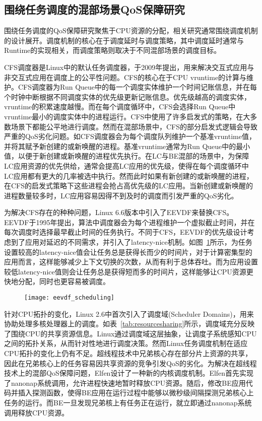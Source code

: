 \subsection{围绕任务调度的混部场景QoS保障研究}


围绕任务调度的QoS保障研究聚焦于CPU资源的分配，相关研究通常围绕调度机制的设计展开。调度机制的核心在于调度延时与调度策略，其中调度延时通常与Runtime的实现相关，而调度策略则取决于不同混部场景的调度目标。

CFS调度器\citep{pabla2009completely}是Linux中的默认任务调度器，于2009年提出，用来解决交互式应用与非交互式应用在调度上的公平性问题。CFS的核心在于CPU vruntime的计算与维护。CFS调度器为Run Queue中的每一个调度实体维护一个时间记账信息，并在每个时钟中断根据不同调度实体的优先级更新记账信息。优先级越高的调度实体，vruntime的积累速度越慢。而在每个调度循环中，CFS会选择Run Queue中vruntime最小的调度实体中的进程运行。CFS中使用了许多启发式的策略，在大多数场景下都能公平地进行调度。然而在混部场景中，CFS的部分启发式逻辑会导致严重的QoS劣化问题。如CFS调度器会为每个调度队列维护一个基准vruntime值，并将其赋予新创建的或新唤醒的进程。基准vruntime通常为Run Queue中的最小值，以便于新创建或新唤醒的进程优先执行。在LC与BE混部的场景中，为保障LC应用资源的优先供给，通常会提高LC应用的优先级，使得在每个调度循环中LC应用都有更大的几率被选中执行。然而此时如果有新创建的或新唤醒的进程，在CFS的启发式策略下这些进程会抢占高优先级的LC应用。当新创建或新唤醒的进程数量较多时，LC应用容易因得不到及时的调度而引发严重的QoS劣化。

为解决CFS存在的种种问题，Linux 6.6版本中引入了EEVDF来替换CFS。EEVDF\citep{stoica1995earliest}于1995年提出，算法中调度器会为每个进程维护一个虚拟截止时间，并在每次调度时选择最早截止时间的任务执行。不同于CFS，EEVDF的优先级设计考虑到了应用对延迟的不同需求，并引入了latency-nice机制。如图~\ref{fig:eevdf_scheduling}所示，为任务设置较高的latency-nice值会让任务总是获得长而少的时间片，对于计算密集型的应用而言，这样能够减少上下文切换的次数，从而有利于总体吞吐。而为应用设置较低latency-nice值则会让任务总是获得短而多的时间片，这样能够让CPU资源更快地分配，同时也更容易被调度。

\begin{figure}[!htbp]
    \centering
    \texttt{[image: eevdf\_scheduling]}
    \label{fig:eevdf_scheduling}
\end{figure}

针对CPU拓扑的变化，Linux 2.6中首次引入了调度域(Scheduler Domains)\citep{schedulerdomains}，用来协助处理多核处理器上的调度。如表~\ref{tab:resourcesharing}所示，调度域充分反映了围绕CPU的共享资源信息。Linux通过调度域这层抽象，让调度子系统感知CPU之间的拓扑关系，从而针对性地进行调度决策。然而Linux任务调度机制在适应CPU拓扑的变化上仍有不足。超线程技术中兄弟核心存在部分片上资源的共享，因此在兄弟核心上的任务容易因共享资源的竞争引发QoS的劣化。为解决在超线程技术上的混部QoS保障问题，Elfen\citep{yang2016elfen}设计了一种新的内核调度机制。Elfen首先实现了nanonap系统调用，允许进程快速地暂时释放CPU资源。随后，修改BE应用代码并插入探测函数，使得BE应用在运行过程中能够以微秒级间隔探测兄弟核心上任务的运行。而BE一旦发现兄弟核上有任务正在运行，就立即通过nanonap系统调用释放CPU资源。

